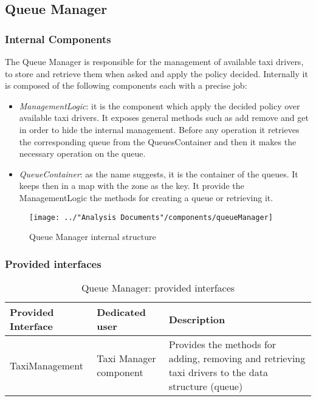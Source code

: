\subsection{Queue Manager}\label{comp:queueManager}
\subsubsection{Internal Components}
The Queue Manager is responsible for the management of available taxi drivers, to store and retrieve them when asked and apply the policy decided. Internally it is composed of the following components each with a precise job:
\begin{itemize}
	\item \textit{ManagementLogic}: it is the component which apply the decided policy over available taxi drivers. It exposes general methods such as add remove and get in order to hide the internal management. Before any operation it retrieves the corresponding queue from the QueuesContainer and then it makes the necessary operation on the queue.
	\item \textit{QueueContainer}: as the name suggests, it is the container of the queues. It keeps then in a map with the zone as the key. It provide the ManagementLogic the methods for creating a queue or retrieving it.
\end{itemize}
\begin{figure}[H]
	\centering
	\texttt{[image: ../"Analysis Documents"/components/queueManager]}
	\label{fig:queuemanager}
	\caption{Queue Manager internal structure}
\end{figure}
\subsubsection{Provided interfaces}
\begin{table}[H]
	\begin{longtable}{| p{} | p{} | p{} |}
		\hline
		\textbf{Provided Interface} & \textbf{Dedicated user} & \textbf{Description} \\ \hline
		TaxiManagement & Taxi Manager component & Provides the methods for adding, removing and retrieving taxi drivers to the data structure (queue) \\ \hline
	\end{longtable}
	\caption{Queue Manager: provided interfaces}
	\label{tab:queuemanager:providedInterfaces}
\end{table}
